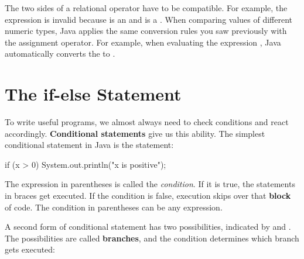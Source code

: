 The two sides of a relational operator have to be compatible.
For example, the expression  is invalid because  is an  and  is a .
When comparing values of different numeric types, Java applies the same conversion rules you saw previously with the assignment operator.
For example, when evaluating the expression , Java automatically converts the  to .

%
%


\section{The if-else Statement}


To write useful programs, we almost always need to check conditions and react accordingly.
{\bf Conditional statements} give us this ability.
The simplest conditional statement in Java is the  statement:

\begin{code}
if (x > 0) {
    System.out.println("x is positive");
}
\end{code}


The expression in parentheses is called the {\em condition}.
If it is true, the statements in braces get executed.
If the condition is false, execution skips over that {\bf block} of code.
The condition in parentheses can be any  expression.


A second form of conditional statement has two possibilities, indicated by  and .
The possibilities are called {\bf branches}, and the condition determines which branch gets executed:

